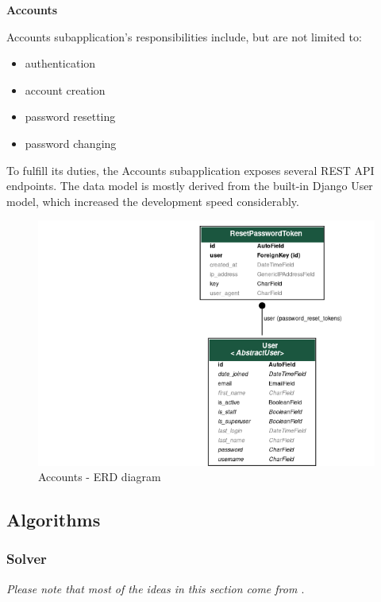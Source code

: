 \medskip

\textbf{Accounts}

Accounts subapplication's responsibilities include, but are not limited to:
\begin{itemize}
	\item authentication
	\item account creation
	\item password resetting 
	\item password changing
\end{itemize}

To fulfill its duties, the Accounts subapplication exposes several REST API endpoints.
The data model is mostly derived from the built-in Django User model, which increased the development speed considerably.
\medskip

 
\begin{figure}[H]
  \caption{Accounts - ERD diagram}
  \centering
    \includegraphics[width=\textwidth]{assets/3-erd-accounts.png}
\end{figure}




\subsection{Algorithms}
\subsubsection{Solver}

\textit{Please note that most of the ideas in this section come from \cite{origami-simulator:paper}}.
\smallskip

